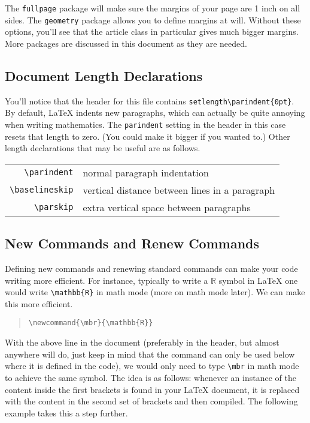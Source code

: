 \documentclass[letterpaper,twoside,10pt]{article}
\begin{document}
The \texttt{fullpage} package will make sure the margins of your page are 1 inch on all sides. The \texttt{geometry} package allows you to define margins at will. Without these options, you'll see that the article class in particular gives much bigger margins. More packages are discussed in this document as they are needed.

\newpage
\subsection{Document Length Declarations}

You'll notice that the header for this file contains \verb!setlength\parindent{0pt}!. By default, {\LaTeX} indents new paragraphs, which can actually be quite annoying when writing mathematics. The \texttt{parindent} setting in the header in this case resets that length to zero. (You could make it bigger if you wanted to.) Other length declarations that may be useful are as follows.

\begin{center}
 \begin{tabular}{rl}
	\small\verb!\parindent! & \small normal paragraph indentation\\
	\small\verb!\baselineskip! & \small vertical distance between lines in a paragraph\\
	\small\verb!\parskip! & \small extra vertical space between paragraphs
 \end{tabular}
\end{center}

\subsection{New Commands and Renew Commands}\label{newcommand}
Defining new commands and renewing standard commands can make your code writing more efficient. For instance, typically to write a $\mathbb{R}$ symbol in {\LaTeX} one would write \verb!\mathbb{R}! in math mode (more on math mode later). We can make this more efficient.

\begin{quote}
 \verb!\newcommand{\mbr}{\mathbb{R}}!
\end{quote}

With the above line in the document (preferably in the header, but almost anywhere will do, just keep in mind that the command can only be used below where it is defined in the code), we would only need to type \verb!\mbr! in math mode to achieve the same symbol. The idea is as follows: whenever an instance of the content inside the first brackets is found in your {\LaTeX} document, it is replaced with the content in the second set of brackets and then compiled. The following example takes this a step further.
\end{document}
